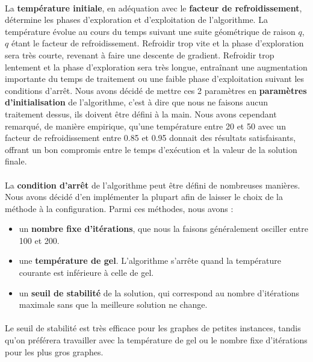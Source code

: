 \documentclass[12pt]{article}
\begin{document}
\paragraph{}La \textbf{température initiale}, en adéquation avec le \textbf{facteur de refroidissement}, détermine les phases d'exploration et d'exploitation de l'algorithme. La température évolue au cours du temps suivant une suite géométrique de raison $q$, $q$ étant le facteur de refroidissement. Refroidir trop vite et la phase d'exploration sera très courte, revenant à faire une descente de gradient. Refroidir trop lentement et la phase d'exploration sera très longue, entraînant une augmentation importante du temps de traitement ou une faible phase d'exploitation suivant les conditions d'arrêt. Nous avons décidé de mettre ces 2 paramètres en \textbf{paramètres d'initialisation} de l'algorithme, c'est à dire que nous ne faisons aucun traitement dessus, ils doivent être défini à la main. Nous avons cependant remarqué, de manière empirique, qu'une température entre 20 et 50 avec un facteur de refroidissement entre 0.85 et 0.95 donnait des résultats satisfaisants, offrant un bon compromis entre le temps d'exécution et la valeur de la solution finale.

\paragraph{}La \textbf{condition d'arrêt} de l'algorithme peut être défini de nombreuses manières. Nous avons décidé d'en implémenter la plupart afin de laisser le choix de la méthode à la configuration. Parmi ces méthodes, nous avons :
\begin{itemize}
\item un \textbf{nombre fixe d'itérations}, que nous la faisons généralement osciller entre 100 et 200.
\item une \textbf{température de gel}. L'algorithme s'arrête quand la température courante est inférieure à celle de gel.
\item un \textbf{seuil de stabilité} de la solution, qui correspond au nombre d'itérations maximale sans que la meilleure solution ne change.
\end{itemize}

\paragraph{}Le seuil de stabilité est très efficace pour les graphes de petites instances, tandis qu'on préférera travailler avec la température de gel ou le nombre fixe d'itérations pour les plus gros graphes.
\end{document}
